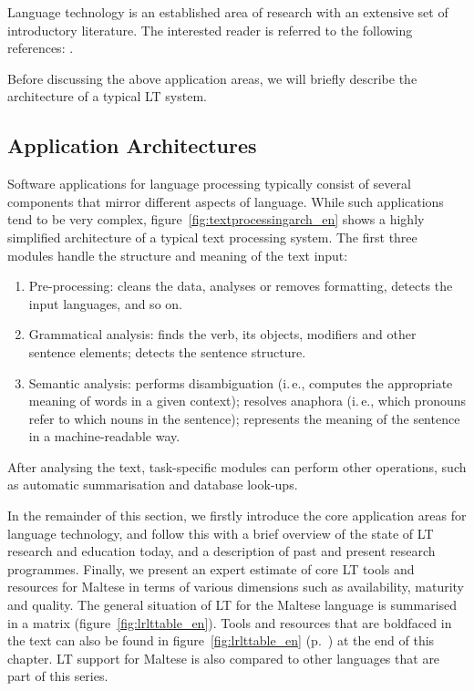 \documentclass[]{../../metanetpaper}
\begin{document}
\begin{multicols}{2}
Language technology is an established area of research with an extensive set of introductory literature. The interested reader is referred to the following references:  \cite{carstensen-etal1, jurafsky-martin01, manning-schuetze1, lt-world1, lt-survey1}.

Before discussing the above application areas, we will briefly describe the architecture of a typical LT system.

\subsection{Application Architectures}

Software applications for language processing typically consist of several components that mirror different aspects of language. While such applications tend to be very complex, figure~\ref{fig:textprocessingarch_en} shows a highly simplified architecture of a typical text processing system. The first three modules handle the structure and meaning of the text input:

\begin{enumerate}
\item Pre-processing: cleans the data, analyses or removes formatting, detects the input languages, and so on.
\item Grammatical analysis: finds the verb, its objects, modifiers and other sentence elements; detects the sentence structure.
\item Semantic analysis: performs disambiguation (i.\,e., computes the appropriate meaning of words in a given context); resolves anaphora (i.\,e., which pronouns refer to which nouns in the sentence); represents the meaning of the sentence in a machine-readable way.
\end{enumerate}

After analysing the text, task-specific modules can perform other operations, such as automatic summarisation and database look-ups.

In the remainder of this section, we firstly introduce the core application areas for language technology, and follow this with a brief overview of the state of LT research and education today, and a description of past and present research programmes. Finally, we present an expert estimate of core LT tools and resources for Maltese in terms of various dimensions such as availability, maturity and quality. The general situation of LT for the Maltese language is summarised in a matrix (figure~\ref{fig:lrlttable_en}). Tools and resources that are boldfaced in the text can also be found in figure~\ref{fig:lrlttable_en} (p.~\pageref{fig:lrlttable_en}) at the end of this chapter. LT support for Maltese is also compared to other languages that are part of this series.


\end{multicols}
\end{document}
